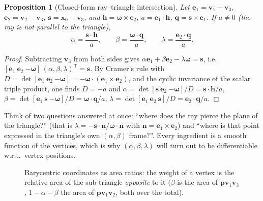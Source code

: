 \documentclass[11pt,a4paper]{article}
\newcommand{\T}{^{\mathsf T}}
\theoremstyle{definition}
\theoremstyle{algstyle}
\theoremstyle{plain}
\newtheorem{proposition}[definition]{Proposition}
\theoremstyle{remark}
\begin{document}
\begin{proposition}[Closed-form ray--triangle intersection]\label{prop:mt}
Let $\bm e_1=\bm v_1-\bm v_3$, $\bm e_2=\bm v_2-\bm v_3$, $\bm s=\bm x_0-\bm v_3$, and
$\bm h=\bm\omega\times\bm e_2$, $a=\bm e_1\cdot\bm h$, $\bm q=\bm s\times\bm e_1$. If $a\neq0$ (the ray is not parallel to the triangle),
\[
\alpha=\frac{\bm s\cdot\bm h}{a},\qquad
\beta=\frac{\bm\omega\cdot\bm q}{a},\qquad
\lambda=\frac{\bm e_2\cdot\bm q}{a}.
\]
\end{proposition}
\begin{proof}
Subtracting $\bm v_3$ from both sides gives $\alpha\bm e_1+\beta\bm e_2-\lambda\bm\omega=\bm s$, i.e.\ $[\bm e_1\ \bm e_2\ {-\bm\omega}]\,(\alpha,\beta,\lambda)\T=\bm s$. By Cramer's rule with $D=\det[\bm e_1\ \bm e_2\ {-\bm\omega}]=-\bm\omega\cdot(\bm e_1\times\bm e_2)$, and the cyclic invariance of the scalar triple product, one finds $D=-a$ and
$\alpha=\det[\bm s\ \bm e_2\ {-\bm\omega}]/D=\bm s\cdot\bm h/a$,
$\beta=\det[\bm e_1\ \bm s\ {-\bm\omega}]/D=\bm\omega\cdot\bm q/a$,
$\lambda=\det[\bm e_1\ \bm e_2\ \bm s]/D=\bm e_2\cdot\bm q/a$.
\end{proof}

\begin{intuition}
Think of two questions answered at once: ``where does the ray pierce the plane of the triangle?'' (that is $\lambda=-\bm s\cdot\bm n/\bm\omega\cdot\bm n$ with $\bm n=\bm e_1\times\bm e_2$) and ``where is that point expressed in the triangle's own $(\alpha,\beta)$ frame?''. Every ingredient is a smooth function of the vertices, which is why $(\alpha,\beta,\lambda)$ will turn out to be differentiable w.r.t.\ vertex positions.
\end{intuition}

\begin{figure}[htbp]
\centering
{}
\caption{Barycentric coordinates as area ratios: the weight of a vertex is the relative area of the sub-triangle \emph{opposite} to it ($\beta$ is the area of $\bm p\bm v_1\bm v_3$, $1-\alpha-\beta$ the area of $\bm p\bm v_1\bm v_2$, both over the total).}
\end{figure}
\end{document}

